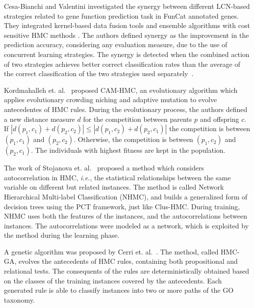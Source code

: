 Cesa-Bianchi and Valentini \cite{Cesa-Bianchi2011} investigated the synergy between different LCN-based strategies related to gene function prediction task in FunCat annotated genes. They integrated kernel-based data fusion tools and ensemble algorithms with cost sensitive HMC methods \cite{Cesa-Bianchi2010,Valentini2011}. The authors defined synergy as the improvement in the prediction accuracy, considering any evaluation measure, due to the use of concurrent learning strategies. The synergy is detected when the combined action of two strategies achieves better correct classification rates than the average of the correct classification of the two strategies used separately~\cite{Cesa-Bianchi2011}.

Kordmahalleh et. al.~\cite{Kordmahalleh2013} proposed CAM-HMC, an evolutionary algorithm which applies evolutionary crowding niching and adaptive mutation to evolve antecedentes of HMC rules. During the evolutionary process, the authors defined a new distance measure $d$ for the competition between parents $p$ and offspring $c$. If $|d(p_1,c_1) + d(p_2,c_2)| \leq |d(p_1,c_2) + d(p_2,c_1)|$ the competition is between $(p_1,c_1)$ and $(p_2,c_2)$. Otherwise, the competition is between $(p_1,c_2)$ and $(p_2,c_1)$. The individuals with highest fitness are kept in the population. %

The work of Stojanova et. al.~\cite{Stojanova2013} proposed a method which considers autocorrelation in HMC, \emph{i.e.}, the statistical relationships between the same variable on different but related instances. The method is called Network Hierarchical Multi-label Classification (NHMC), and builds a generalized form of decision trees using the PCT framework, just like Clus-HMC. During training, NHMC uses both the features of the instances, and the autocorrelations between instances. The autocorrelations were modeled as a network, which is exploited by the method during the learning phase.

A genetic algorithm was proposed by Cerri et. al.~\cite{Cerri2014}. The method, called HMC-GA, evolves the antecedents of HMC rules, containing both propositional and relational tests. The consequents of the rules are deterministically obtained based on the classes of the training instances covered by the antecedents. Each generated rule is able to classify instances into two or more paths of the GO taxonomy.

